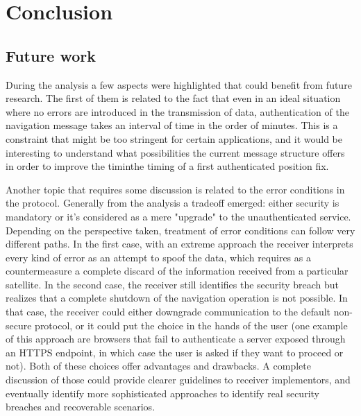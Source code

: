 \chapter{Conclusion}
\label{ch:conclusion}

\section{Future work}

During the analysis a few aspects were highlighted that could benefit from
future research. The first of them is related to the fact that even in an ideal
situation where no errors are introduced in the transmission of data,
authentication of the navigation message takes an interval of time in the order
of minutes.  This is a constraint that might be too stringent for certain
applications, and it would be interesting to understand what possibilities the
current message structure offers in order to improve the timinthe timing of a first
authenticated position fix.

\vspace{\baselineskip}

Another topic that requires some discussion is related to the error conditions
in the protocol. Generally from the analysis a tradeoff emerged: either security
is mandatory or it's considered as a mere "upgrade" to the unauthenticated
service. Depending on the perspective taken, treatment of error conditions can
follow very different paths. In the first case, with an extreme approach the
receiver interprets every kind of error as an attempt to spoof the data, which
requires as a countermeasure a complete discard of the information received from
a particular satellite. In the second case, the receiver still identifies the
security breach but realizes that a complete shutdown of the navigation
operation is not possible. In that case, the receiver could either downgrade
communication to the default non-secure protocol, or it could put the choice in
the hands of the user (one example of this approach are browsers that fail to
authenticate a server exposed through an HTTPS endpoint, in which case the user
is asked if they want to proceed or not). Both of these choices
offer advantages and drawbacks. A complete discussion of those could provide
clearer guidelines to receiver implementors, and eventually identify more
sophisticated approaches to identify real security breaches and recoverable
scenarios.

\vspace{\baselineskip}

